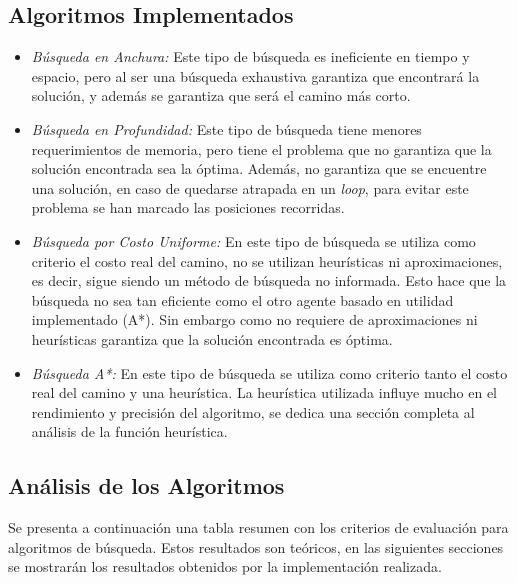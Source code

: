 \documentclass[letter, titlepage, 10pt]{article}
\begin{document}
\subsection{Algoritmos Implementados}
    \begin{itemize}
      \item{\textit{Búsqueda en Anchura: }} Este tipo de búsqueda es ineficiente en tiempo y espacio, pero al ser una búsqueda exhaustiva garantiza que encontrará la solución, y además se garantiza que será el camino más corto.
      \item{\textit{Búsqueda en Profundidad: }} Este tipo de búsqueda tiene menores requerimientos de memoria, pero tiene el problema que no garantiza que la solución encontrada sea la óptima. Además, no garantiza que se encuentre una solución, en caso de quedarse atrapada en un \textit{loop}, para evitar este problema se han marcado las posiciones recorridas.  
      \item{\textit{Búsqueda por Costo Uniforme: }} En este tipo de búsqueda se utiliza como criterio el costo real del camino, no se utilizan heurísticas ni aproximaciones, es decir, sigue siendo un método de búsqueda no informada. Esto hace que la búsqueda no sea tan eficiente como el otro agente basado en utilidad implementado (A*). Sin embargo como no requiere de aproximaciones ni heurísticas garantiza que la solución encontrada es óptima. 
      \item{\textit{Búsqueda A*: }}  En este tipo de búsqueda se utiliza como criterio tanto el costo real del camino y una heurística. La heurística utilizada influye mucho en el rendimiento y precisión del algoritmo, se dedica una sección completa al análisis de la función heurística.
    \end{itemize}       

\subsection{Análisis de los Algoritmos}
Se presenta a continuación una tabla resumen con los criterios de evaluación para algoritmos de búsqueda. Estos resultados son teóricos, en las siguientes secciones se mostrarán los resultados obtenidos por la implementación realizada.
\end{document}
